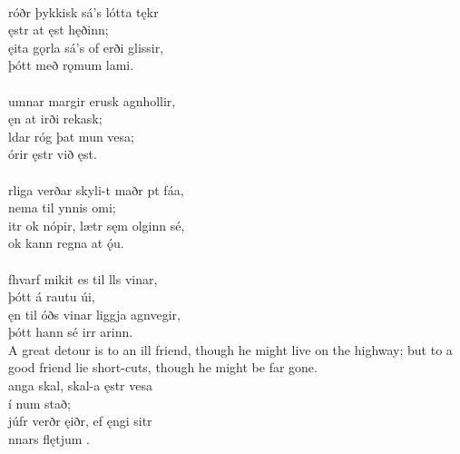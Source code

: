  \\

\bva {}róðr þykkisk \hld sá's lótta tękr \\%
\ind {}ęstr at ęst hęðinn; \\%
ęita gǫrla \hld sá's of erði glissir, \\%
\ind þótt með rǫmum lami.\\%

 \\

\bva {}umnar margir \hld erusk agnhollir, \\%
\ind ęn at irði rekask; \\%
ldar róg \hld þat mun  vesa; \\%
\ind órir ęstr við ęst.\\%

 \\

\bva {}rliga verðar \hld skyli-t maðr pt fáa, \\%
\ind nema til ynnis omi; \\%
itr ok nópir, \hld lætr sęm olginn sé, \\%
\ind ok kann regna at ǫ́u.\\%

 \\

\bva {}fhvarf mikit \hld es til lls vinar, \\%
\ind þótt á rautu úi, \\%
ęn til óðs vinar \hld liggja agnvegir, \\%
\ind þótt hann sé irr arinn.\\%

\bvb A great detour is to an ill friend, though he might live on the highway; but to a good friend lie short-cuts, though he might be far gone. \\

\bva {}anga skal, \hld skal-a ęstr vesa \\%
\ind {} í num stað; \\%
júfr verðr ęiðr, \hld ef ęngi sitr \\%
\ind {}nnars flętjum .\\%


